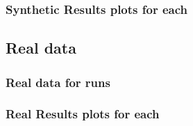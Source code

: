\documentclass[7pt]{beamer}
\begin{document}
% 
\begin{frame}
 \frametitle{Synthetic Results plots for each}
\end{frame}

\subsection{Real data}
% 
\begin{frame}
 \frametitle{Real data for runs}
\end{frame}

% 
\begin{frame}
 \frametitle{Real Results plots for each}
\end{frame}

\end{document}

